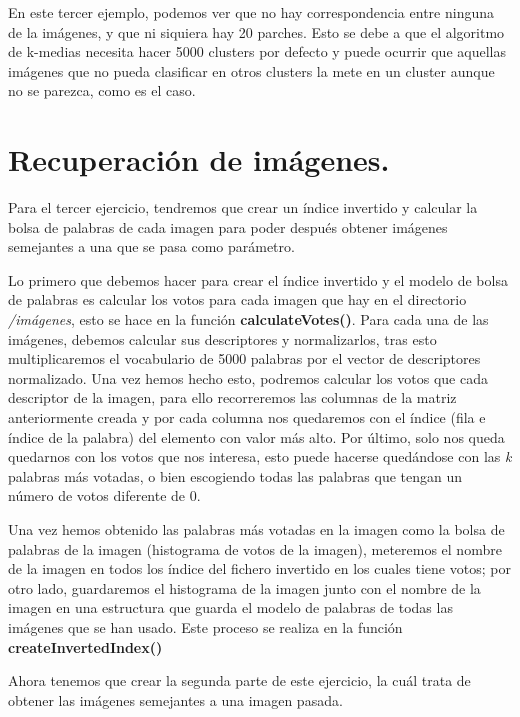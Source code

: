 	\vspace{0.06in}
	En este tercer ejemplo, podemos ver que no hay correspondencia entre ninguna de la imágenes, y que ni siquiera hay 20 parches. Esto se debe a que el algoritmo de k-medias necesita hacer 5000 clusters por defecto y puede ocurrir que aquellas imágenes que no pueda clasificar en otros clusters la mete en un cluster aunque no se parezca, como es el caso.
	
	\section[Ejercicio 3]{Recuperación de imágenes.}
	Para el tercer ejercicio, tendremos que crear un índice invertido y calcular la bolsa de palabras de cada imagen para poder después obtener imágenes semejantes a una que se pasa como parámetro.
	
	\vspace{0.06in}
	Lo primero que debemos hacer para crear el índice invertido y el modelo de bolsa de palabras es calcular los votos para cada imagen que hay en el directorio \textit{/imágenes}, esto se hace en la función \textbf{calculateVotes()}. Para cada una de las imágenes, debemos calcular sus descriptores y normalizarlos, tras esto multiplicaremos el vocabulario de 5000 palabras por el vector de descriptores normalizado. Una vez hemos hecho esto, podremos calcular los votos que cada descriptor de la imagen, para ello recorreremos las columnas de la matriz anteriormente creada y por cada columna nos quedaremos con el índice (fila e índice de la palabra) del elemento con valor más alto. Por último, solo nos queda quedarnos con los votos que nos interesa, esto puede hacerse quedándose con las \textit{k} palabras más votadas, o bien escogiendo todas las palabras que tengan un número de votos diferente de 0.
	
	\vspace{0.06in}
	Una vez hemos obtenido las palabras más votadas en la imagen como la bolsa de palabras de la imagen (histograma de votos de la imagen), meteremos el nombre de la imagen en todos los índice del fichero invertido en los cuales tiene votos; por otro lado, guardaremos el histograma de la imagen junto con el nombre de la imagen en una estructura que guarda el modelo de palabras de todas las imágenes que se han usado. Este proceso se realiza en la función \textbf{createInvertedIndex()}
	
	\vspace{0.06in}
	Ahora tenemos que crear la segunda parte de este ejercicio, la cuál trata de obtener las imágenes semejantes a una imagen pasada.
	
